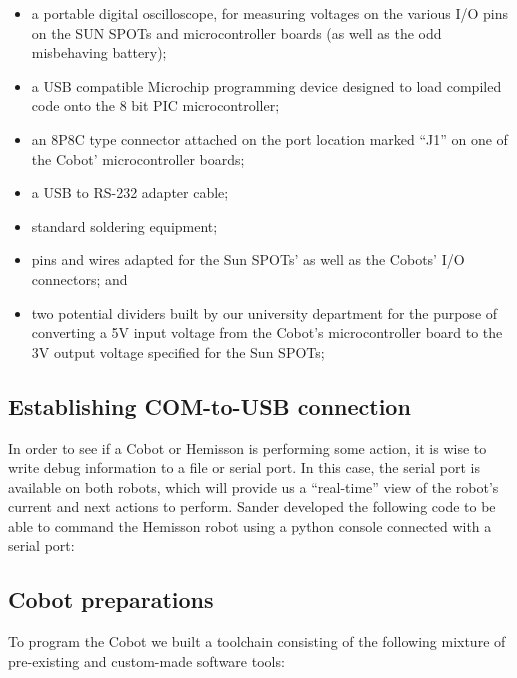 \documentclass[a4paper,10pt]{article} %
\begin{document}
\begin{itemize}
    \item a portable digital oscilloscope, for measuring voltages on the various
    I/O pins on the SUN SPOTs and microcontroller boards (as well as the odd
    misbehaving battery);
    \item a USB compatible Microchip programming device designed to load compiled code
    onto the 8 bit PIC microcontroller;
    \item an 8P8C type connector attached on the port location marked ``J1'' on
    one of the Cobot' microcontroller boards;
    \item a USB to RS-232 adapter cable;
    \item standard soldering equipment;
    \item pins and wires adapted for the Sun SPOTs' as well as the Cobots' I/O
    connectors; and
    \item two potential dividers built by our university department for the
    purpose of converting a 5V input voltage from the Cobot's microcontroller
    board to the 3V output voltage specified for the Sun SPOTs;
\end{itemize}


\subsection{Establishing COM-to-USB connection} %
\label{sub:Establishing COM-to-USB connection}

In order to see if a Cobot or Hemisson is performing some action, it is wise to
write debug information to a file or serial port. In this case, the serial port
is available on both robots, which will provide us a ``real-time'' view of the
robot's current and next actions to perform. Sander developed the following code
to be able to command the Hemisson robot using a python console connected with a
serial port:




\subsection{Cobot preparations} %

To program the Cobot we built a toolchain consisting of the following mixture of
pre-existing and custom-made software tools:
\end{document}
